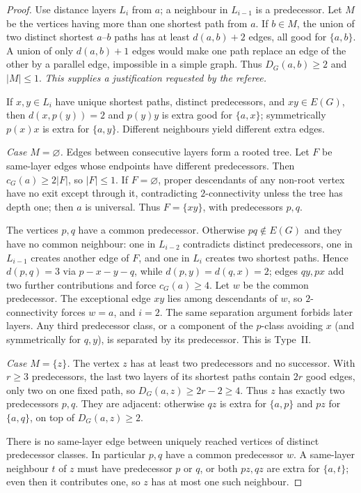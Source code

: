 \documentclass[11pt,a4paper]{article}
\theoremstyle{plain}
\theoremstyle{definition}
\theoremstyle{remark}
\begin{document}
\label{pf:low}
\lemlow*
\begin{proof}
Use distance layers $L_i$ from $a$; a neighbour in $L_{i-1}$ is a
predecessor. Let $M$ be the vertices having more than one shortest path
from $a$. If $b\in M$, the union of two distinct shortest $a$--$b$ paths
has at least $d(a,b)+2$ edges, all good for $\{a,b\}$. A union of only
$d(a,b)+1$ edges would make one path replace an edge of the other by a
parallel edge, impossible in a simple graph. Thus $D_G(a,b)\ge2$ and
$|M|\le1$. \emph{This supplies a justification requested by the referee.}

If $x,y\in L_i$ have unique shortest paths, distinct predecessors, and
$xy\in E(G)$, then $d(x,p(y))=2$ and $p(y)y$ is extra good for
$\{a,x\}$; symmetrically $p(x)x$ is extra for $\{a,y\}$. Different
neighbours yield different extra edges.

\emph{Case $M=\varnothing$.}
Edges between consecutive layers form a rooted tree. Let $F$ be
same-layer edges whose endpoints have different predecessors. Then
$c_G(a)\ge2|F|$, so $|F|\le1$. If $F=\varnothing$, proper descendants of
any non-root vertex have no exit except through it, contradicting
$2$-connectivity unless the tree has depth one; then $a$ is universal.
Thus $F=\{xy\}$, with predecessors $p,q$.

The vertices $p,q$ have a common predecessor. Otherwise $pq\notin E(G)$
and they have no common neighbour: one in $L_{i-2}$ contradicts distinct
predecessors, one in $L_{i-1}$ creates another edge of $F$, and one in
$L_i$ creates two shortest paths. Hence $d(p,q)=3$ via $p-x-y-q$, while
$d(p,y)=d(q,x)=2$; edges $qy,px$ add two further contributions and force
$c_G(a)\ge4$. Let $w$ be the common predecessor. The exceptional edge
$xy$ lies among descendants of $w$, so $2$-connectivity forces $w=a$,
and $i=2$. The same separation argument forbids later layers. Any third
predecessor class, or a component of the $p$-class avoiding $x$ (and
symmetrically for $q,y$), is separated by its predecessor. This is
Type~II.

\emph{Case $M=\{z\}$.}
The vertex $z$ has at least two predecessors and no successor. With
$r\ge3$ predecessors, the last two layers of its shortest paths contain
$2r$ good edges, only two on one fixed path, so
$D_G(a,z)\ge2r-2\ge4$. Thus $z$ has exactly two predecessors $p,q$.
They are adjacent: otherwise $qz$ is extra for $\{a,p\}$ and $pz$ for
$\{a,q\}$, on top of $D_G(a,z)\ge2$.

There is no same-layer edge between uniquely reached vertices of distinct
predecessor classes. In particular $p,q$ have a common predecessor $w$.
A same-layer neighbour $t$ of $z$ must have predecessor $p$ or $q$, or
both $pz,qz$ are extra for $\{a,t\}$; even then it contributes one, so
$z$ has at most one such neighbour.


\end{proof}
\end{document}
